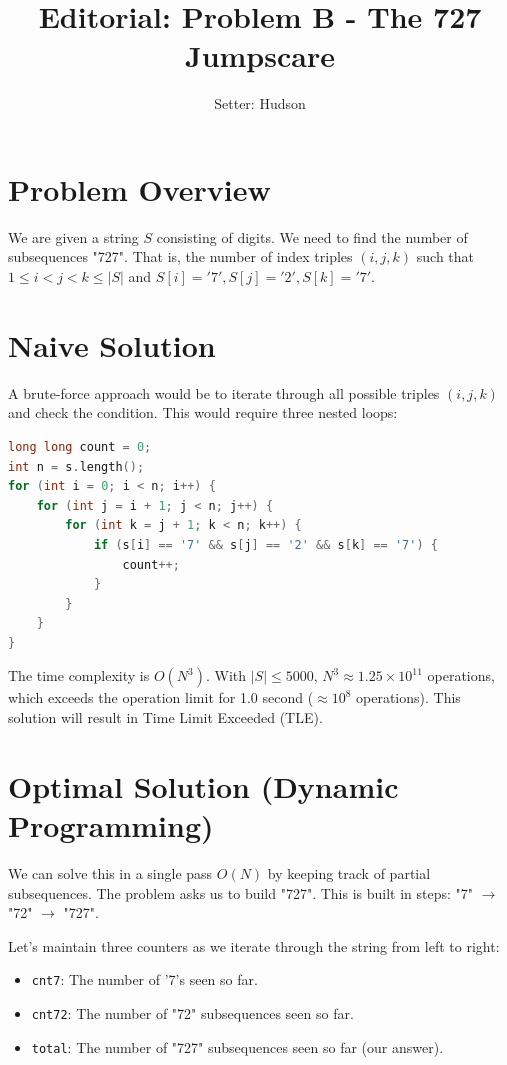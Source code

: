\documentclass[11pt]{article}
\title{\textbf{Editorial: Problem B - The 727 Jumpscare}}
\author{Setter: Hudson}
\date{}
\begin{document}
\maketitle

\section*{Problem Overview}
We are given a string $S$ consisting of digits. We need to find the number of subsequences "727". That is, the number of index triples $(i, j, k)$ such that $1 \le i < j < k \le |S|$ and $S[i] = '7', S[j] = '2', S[k] = '7'$.

\section*{Naive Solution}
A brute-force approach would be to iterate through all possible triples $(i, j, k)$ and check the condition.
This would require three nested loops:
\begin{lstlisting}[language=C++]
long long count = 0;
int n = s.length();
for (int i = 0; i < n; i++) {
    for (int j = i + 1; j < n; j++) {
        for (int k = j + 1; k < n; k++) {
            if (s[i] == '7' && s[j] == '2' && s[k] == '7') {
                count++;
            }
        }
    }
}
\end{lstlisting}
The time complexity is $O(N^3)$. With $|S| \le 5000$, $N^3 \approx 1.25 \times 10^{11}$ operations, which exceeds the operation limit for 1.0 second ($\approx 10^8$ operations). This solution will result in Time Limit Exceeded (TLE).

\section*{Optimal Solution (Dynamic Programming)}
We can solve this in a single pass $O(N)$ by keeping track of partial subsequences. The problem asks us to build "727". This is built in steps: "7" $\rightarrow$ "72" $\rightarrow$ "727".

Let's maintain three counters as we iterate through the string from left to right:
\begin{itemize}
    \item \texttt{cnt7}: The number of '7's seen so far.
    \item \texttt{cnt72}: The number of "72" subsequences seen so far.
    \item \texttt{total}: The number of "727" subsequences seen so far (our answer).
\end{itemize}
\end{document}
